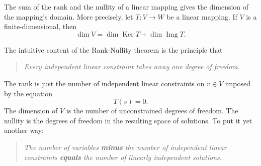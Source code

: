 \documentclass{article}
\begin{document}
The sum of the rank and the nullity of a linear mapping gives
the dimension of the mapping's domain. More precisely, let
$T:V\rightarrow W$ be a linear mapping. If $V$ is a
finite-dimensional, then
$$\dim V = \dim \mathop{\mathrm{Ker}} T + \dim \mathop{\mathrm{Img}}
T.$$

The intuitive content of the Rank-Nullity theorem is the principle that
\begin{quote}\em
  Every independent linear constraint takes away one degree of freedom.
\end{quote}
The rank is just the number of independent linear constraints on $v\in
V$ imposed
by the equation
$$T(v)=0.$$
The dimension of $V$ is the number of unconstrained degrees of freedom.
The nullity is the degrees of freedom in the resulting space of
solutions.
To put it yet another way:
\begin{quote} \em
  The number of variables {\bf minus} the number of independent linear
  constraints {\bf equals} 
 the number of linearly independent solutions.
\end{quote}
\end{document}
